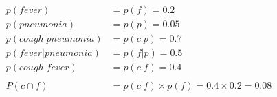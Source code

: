 \begin{align*}
p(fever)&=p(f)=0.2 \\
p(pneumonia)&=p(p)=0.05 \\
p(cough|pneumonia)&=p(c|p)=0.7 \\
p(fever|pneumonia)&=p(f|p)=0.5 \\
p(cough|fever)&=p(c|f)=0.4 \\
\\
P(c\cap f)&=p(c|f)\times p(f)=0.4\times 0.2 = 0.08 \\
\end{align*} %